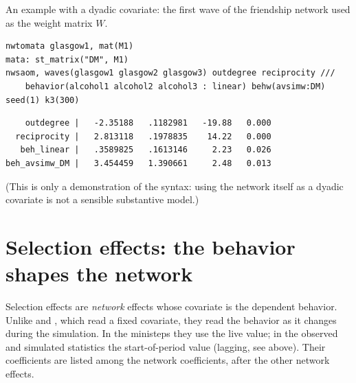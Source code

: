 An example with a dyadic covariate: the first wave of the friendship network used as the weight matrix $W$.
\begin{lstlisting}
nwtomata glasgow1, mat(M1)
mata: st_matrix("DM", M1)
nwsaom, waves(glasgow1 glasgow2 glasgow3) outdegree reciprocity ///
    behavior(alcohol1 alcohol2 alcohol3 : linear) behw(avsimw:DM) seed(1) k3(300)
\end{lstlisting}
\begin{lstlisting}
    outdegree |   -2.35188   .1182981   -19.88   0.000
  reciprocity |   2.813118   .1978835    14.22   0.000
   beh_linear |   .3589825   .1613146     2.23   0.026
beh_avsimw_DM |   3.454459   1.390661     2.48   0.013
\end{lstlisting}
(This is only a demonstration of the syntax: using the network itself as a dyadic covariate is not a sensible substantive model.)

\section{Selection effects: the behavior shapes the network}\label{sec:selection}

Selection effects are \emph{network} effects whose covariate is the dependent behavior. Unlike  and , which read a fixed covariate, they read the behavior as it changes during the simulation. In the ministeps they use the live value; in the observed and simulated statistics the start-of-period value (lagging, see above). Their coefficients are listed among the network coefficients, after the other network effects.

